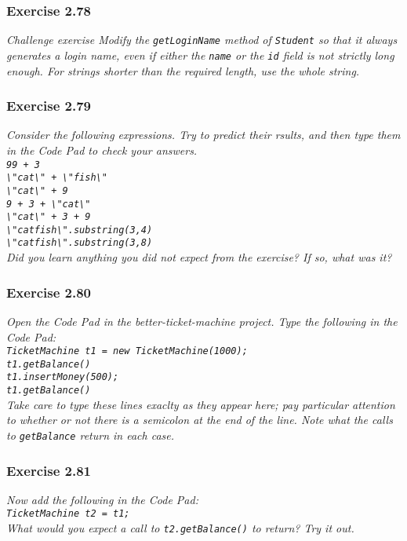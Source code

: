 \subsubsection*{Exercise 2.78}
\textit{Challenge exercise Modify the \lstinline{getLoginName} method of 
\lstinline{Student} so that it always generates a login name, even if either 
the \lstinline{name} or the \lstinline{id} field is not strictly long enough. 
For strings shorter than the required length, use the whole string. }\\

\subsubsection*{Exercise 2.79}
\textit{Consider the following expressions. Try to predict their rsults, and 
then type them in the Code Pad to check your answers. \\
\lstinline{99 + 3}\\
\lstinline{\"cat\" + \"fish\"}\\
\lstinline{\"cat\" + 9}\\
\lstinline{9 + 3 + \"cat\"}\\
\lstinline{\"cat\" + 3 + 9}\\
\lstinline{\"catfish\".substring(3,4)}\\
\lstinline{\"catfish\".substring(3,8)}\\
Did you learn anything you did not expect from the exercise? If so, what was 
it? }\\

\subsubsection*{Exercise 2.80}
\textit{Open the Code Pad in the better-ticket-machine project. Type the 
following in the Code Pad: \\
\lstinline{TicketMachine t1 = new TicketMachine(1000);}\\
\lstinline{t1.getBalance()}\\
\lstinline{t1.insertMoney(500);}\\
\lstinline{t1.getBalance()}\\
Take care to type these lines exaclty as they appear here; pay particular 
attention to whether or not there is a semicolon at the end of the line. Note 
what the calls to \lstinline{getBalance} return in each case. 
}\\

\subsubsection*{Exercise 2.81}
\textit{Now add the following in the Code Pad: \\
\lstinline{TicketMachine t2 = t1;}\\
What would you expect a call to \lstinline{t2.getBalance()} to return? Try it 
out. }\\

